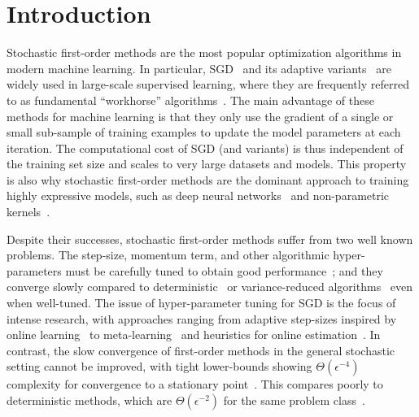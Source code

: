 
\chapter{Introduction}\label{ch:Introduction}

Stochastic first-order methods are the most popular optimization algorithms in modern machine learning.
In particular, \ac{SGD}~\citep{robbins1951sgd} and its adaptive variants~\citep{duchi2011adagrad, tieleman2012rmsprop, zeiler2012adadelta, kingma2015adam} are widely used in large-scale supervised learning, where they are frequently referred to as fundamental ``workhorse'' algorithms~\citep{qian2019improvedrates, assran2019sgpush, grosse2015scaling}. 
The main advantage of these methods for machine learning is that they only use the gradient of a single or small sub-sample of training examples to update the model parameters at each iteration.
The computational cost of \ac{SGD} (and variants) is thus independent of the training set size and scales to very large datasets and models.
This property is also why stochastic first-order methods are the dominant approach to training highly expressive models, such as deep neural networks~\citep{zhang2017understanding, bengio2012practical} and non-parametric kernels~\citep{liang2018just, belkin2019datainterp}.

Despite their successes, stochastic first-order methods suffer from two well known problems. 
The step-size, momentum term, and other algorithmic hyper-parameters must be carefully tuned to obtain good performance~\citep{bengio2012practical, schaul2013no, li2019convergence, choi2019empirical}; and
they converge slowly compared to deterministic~\citep{nesterov2004lectures} or variance-reduced algorithms~\citep{leroux2012sag, johnson2013svrg, defazio2014saga} even when well-tuned.
The issue of hyper-parameter tuning for \ac{SGD} is the focus of intense research, with approaches ranging from adaptive step-sizes inspired by online learning~\citep{luo2019adabound, li2019convergence, orabona2017coin} to meta-learning~\citep{baydin2018hypergradient, schraudolph1999local, sutton1992gain, almeida1998parameter, plagianakos2001learning, shao2000rates} and heuristics for online estimation~\citep{schaul2013no, rolinek2018l4, tan2016bb}.
In contrast, the slow convergence of first-order methods in the general stochastic setting cannot be improved, with tight lower-bounds showing \( \Theta(\epsilon^{-4}) \) complexity for convergence to a stationary point~\citep{drori2019complexity, arjevani2019lower}.
This compares poorly to deterministic methods, which are \( \Theta(\epsilon^{-2}) \) for the same problem class~\citep{carmon2019lower}.

